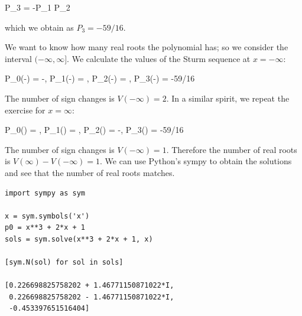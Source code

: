 \bee
P_3 = -P_1 \mod P_2
\eee

which we obtain as $P_3 = - 59/16$.

We want to know how many real roots the polynomial has; so we consider the interval $(-\infty, \infty]$. We calculate the values of the Sturm sequence at $x = -\infty$:

\bee
P_0(-\infty) = -\infty, P_1(-\infty) = \infty, P_2(-\infty) = \infty, P_3(-\infty) = -59/16
\eee

The number of sign changes is $V(-\infty) = 2$. In a similar spirit, we repeat the exercise for $x = \infty$:

\bee
P_0(\infty) = \infty, P_1(\infty) = \infty, P_2(\infty) = -\infty, P_3(\infty) = -59/16
\eee

The number of sign changes is $V(-\infty) = 1$. Therefore the number of real roots is $V(\infty) - V(-\infty) = 1$. We can use Python's sympy to obtain the solutions and see that the number of real roots matches.

\begin{verbatim}
import sympy as sym

x = sym.symbols('x')
p0 = x**3 + 2*x + 1
sols = sym.solve(x**3 + 2*x + 1, x)

[sym.N(sol) for sol in sols]

[0.226698825758202 + 1.46771150871022*I,
 0.226698825758202 - 1.46771150871022*I,
 -0.453397651516404]
\end{verbatim}


